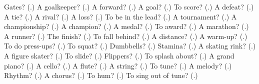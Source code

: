 \begin{tcolorbox}[breakable,colback=teal!4,colframe=teal!35!black,title={Before you move on}]
Gates? (\textbf{}.) A goalkeeper? (\textbf{}.) A forward? (\textbf{}.) A goal? (\textbf{}.) To score? (\textbf{}.) A defeat? (\textbf{}.) A tie? (\textbf{}.) A rival? (\textbf{}.) A loss? (\textbf{}.) To be in the lead? (\textbf{}.) A tournament? (\textbf{}.) A championship? (\textbf{}.) A champion? (\textbf{}.) A medal? (\textbf{}.) To award? (\textbf{}.) A marathon? (\textbf{}.) A runner? (\textbf{}.) The finish? (\textbf{}.) To fall behind? (\textbf{}.) A distance? (\textbf{}.) A warm-up? (\textbf{}.) To do press-ups? (\textbf{}.) To squat? (\textbf{}.) Dumbbells? (\textbf{}.) Stamina? (\textbf{}.) A skating rink? (\textbf{}.) A figure skater? (\textbf{}.) To slide? (\textbf{}.) Flippers? (\textbf{}.) To splash about? (\textbf{}.) A grand piano? (\textbf{}.) A cello? (\textbf{}.) A flute? (\textbf{}.) A string? (\textbf{}.) To tune? (\textbf{}.) A melody? (\textbf{}.) Rhythm? (\textbf{}.) A chorus? (\textbf{}.) To hum? (\textbf{}.) To sing out of tune? (\textbf{}.)
\end{tcolorbox}

